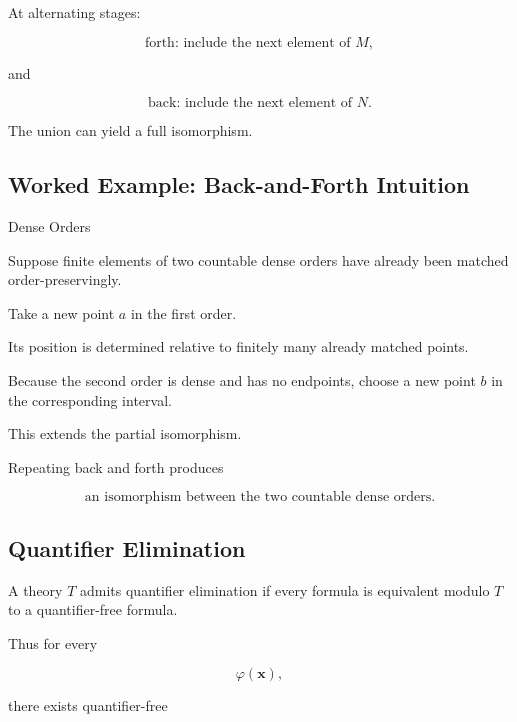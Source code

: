 At alternating stages:

\[
\boxed{
\text{forth: include the next element of }M,
}
\]

and

\[
\boxed{
\text{back: include the next element of }N.
}
\]

The union can yield a full isomorphism.

\subsection{Worked Example: Back-and-Forth Intuition}
\label{subsec:worked-back-and-forth}

\begin{workedexamplebox}{Dense Orders}

Suppose finite elements of two countable dense orders have already been
matched order-preservingly.

Take a new point \(a\) in the first order.

Its position is determined relative to finitely many already matched
points.

Because the second order is dense and has no endpoints, choose a new point
\(b\) in the corresponding interval.

This extends the partial isomorphism.

Repeating back and forth produces

\begin{answerbox}
\[
\boxed{
\text{an isomorphism between the two countable dense orders.}
}
\]
\end{answerbox}

\end{workedexamplebox}

\subsection{Quantifier Elimination}
\label{subsec:quantifier-elimination}

A theory \(T\) admits quantifier elimination if every formula is equivalent
modulo \(T\) to a quantifier-free formula.

Thus for every

\[
\varphi(\mathbf{x}),
\]

there exists quantifier-free

